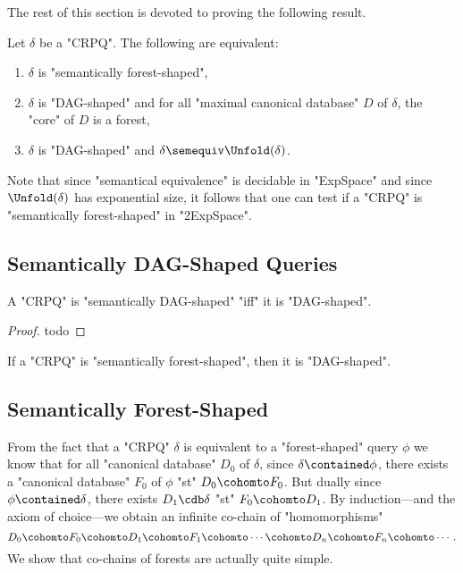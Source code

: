 The rest of this section is devoted to proving the following result.

\begin{theorem}
	\AP\label{thm:charac-semantically-forest-shaped}
	Let $\delta$ be a "CRPQ". The following are equivalent:
	\begin{enumerate}
		\item $\delta$ is "semantically forest-shaped",
		\item $\delta$ is "DAG-shaped" and
			for all "maximal canonical database" $D$ of $\delta$, the "core" of $D$ is a forest,
		\item $\delta$ is "DAG-shaped" and $\delta \semequiv \Unfold(\delta)$. 
	\end{enumerate}
\end{theorem}

Note that since "semantical equivalence" is decidable in "ExpSpace" and
since $\Unfold(\delta)$ has exponential size, it follows that one can test if
a "CRPQ" is "semantically forest-shaped" in "2ExpSpace".

\subsection{Semantically DAG-Shaped Queries}

\begin{proposition}
	A "CRPQ" is "semantically DAG-shaped" "iff" it is "DAG-shaped".
\end{proposition}

\begin{proof}
todo
\end{proof}

\begin{corollary}
	\AP\label{coro:sem-forest-implies-DAG}
	If a "CRPQ" is "semantically forest-shaped", then it is "DAG-shaped".
\end{corollary}

\subsection{Semantically Forest-Shaped}

From the fact that a "CRPQ" $\delta$ is equivalent to a "forest-shaped" query $\phi$
we know that for all "canonical database" $D_0$ of $\delta$, since $\delta \contained \phi$,
there exists a "canonical database" $F_0$ of $\phi$ "st" $D_0 \cohomto F_0$.
But dually since $\phi \contained \delta$, there exists $D_1 \cdb \delta$ "st" $F_0 \cohomto D_1$.
By induction---and the axiom of choice---we obtain an infinite co-chain of "homomorphisms"
\[
	D_0 \cohomto F_0 \cohomto D_1 \cohomto F_1 \cohomto \cdots \cohomto D_n \cohomto F_n \cohomto \cdots.
\]
We show that co-chains of forests are actually quite simple.

